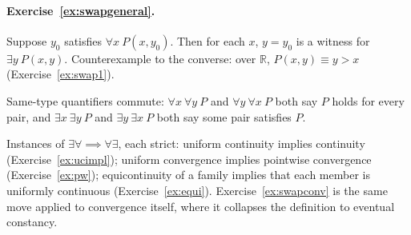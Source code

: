 \documentclass{workbook}
\theoremstyle{definition}
\newcommand{\R}{\mathbb{R}}
\newcommand{\ans}[1]{\paragraph{Exercise~\ref{#1}.}}
\begin{document}
\ans{ex:swapgeneral}
Suppose $y_0$ satisfies $\forall x\ P(x, y_0)$. Then for each $x$, $y = y_0$ is a witness for $\exists y\ P(x, y)$. Counterexample to the converse: over $\R$, $P(x, y) \equiv y > x$ (Exercise~\ref{ex:swap1}).

Same-type quantifiers commute: $\forall x\ \forall y\ P$ and $\forall y\ \forall x\ P$ both say $P$ holds for every pair, and $\exists x\ \exists y\ P$ and $\exists y\ \exists x\ P$ both say some pair satisfies $P$.

Instances of $\exists\forall \implies \forall\exists$, each strict: uniform continuity implies continuity (Exercise~\ref{ex:ucimpl}); uniform convergence implies pointwise convergence (Exercise~\ref{ex:pw}); equicontinuity of a family implies that each member is uniformly continuous (Exercise~\ref{ex:equi}). Exercise~\ref{ex:swapconv} is the same move applied to convergence itself, where it collapses the definition to eventual constancy.
\end{document}

